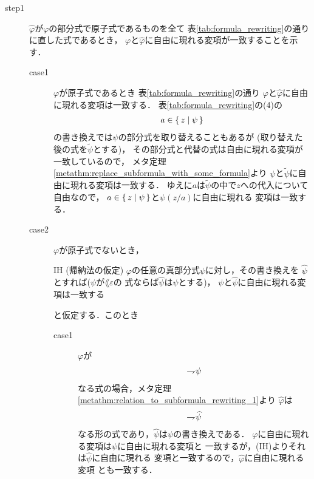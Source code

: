 	\begin{metaprf}\mbox{}
		\begin{description}
			\item[step1] $\widehat{\varphi}$が$\varphi$の部分式で原子式であるものを全て
				表\ref{tab:formula_rewriting}の通りに直した式であるとき，
				$\varphi$と$\widehat{\varphi}$に自由に現れる変項が一致することを示す．
				\begin{description}
					\item[case1] $\varphi$が原子式であるとき
						表\ref{tab:formula_rewriting}の通り
						$\varphi$と$\widehat{\varphi}$に自由に現れる変項は一致する．
						表\ref{tab:formula_rewriting}の(4)の
						\begin{align}
							a \in \{\, z \mid \psi\, \}
						\end{align}
						の書き換えでは$\psi$の部分式を取り替えることもあるが
						(取り替えた後の式を$\widetilde{\psi}$とする)，
						その部分式と代替の式は自由に現れる変項が一致しているので，
						メタ定理\ref{metathm:replace_subformula_with_some_formula}より
						$\psi$と$\widetilde{\psi}$に自由に現れる変項は一致する．
						ゆえに$a$は$\widetilde{\psi}$の中で$z$への代入について自由なので，
						$a \in \{\, z \mid \psi\, \}$と$\psi(z/a)$に自由に現れる
						変項は一致する．
						
					\item[case2] $\varphi$が原子式でないとき，
						\begin{itembox}[l]{IH (帰納法の仮定)}
							$\varphi$の任意の真部分式$\psi$に対し，その書き換えを
							$\widehat{\psi}$とすれば($\psi$が$\lang{\varepsilon}$の
							式ならば$\widehat{\psi}$は$\psi$とする)，
							$\psi$と$\widehat{\psi}$に自由に現れる変項は一致する
						\end{itembox}
						と仮定する．このとき
						\begin{description}
							\item[case1] $\varphi$が
								\begin{align}
									\rightharpoondown\hspace{-0.25em} \psi
								\end{align}
								なる式の場合，メタ定理
								\ref{metathm:relation_to_subformula_rewriting_1}より
								$\widehat{\varphi}$は
								\begin{align}
									\rightharpoondown\hspace{-0.25em} \widehat{\psi}
								\end{align}
								なる形の式であり，$\widehat{\psi}$は$\psi$の書き換えである．
								$\varphi$に自由に現れる変項は$\psi$に自由に現れる変項と
								一致するが，(IH)よりそれは$\widehat{\psi}$に自由に現れる
								変項と一致するので，$\widehat{\varphi}$に自由に現れる変項
								とも一致する．
						

\end{description}
\end{description}
\end{description}
\end{metaprf}
